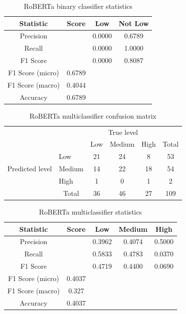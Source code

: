 \documentclass[12pt, a4paper]{article}
\begin{document}
\begin{table}[ht]
\centering
\begin{tabular}{||c c c c||} 
 \hline
 Statistic & Score & Low & Not Low  \\ [0.5ex] 
 \hline\hline
 Precision &  & 0.0000 & 0.6789 \\ 
 Recall & & 0.0000 & 1.0000 \\
 F1 Score &  & 0.0000 & 0.8087 \\
 F1 Score (micro) & 0.6789 & & \\
 F1 Score (macro)  & 0.4044 & &  \\ 
 Accuracy  & 0.6789 & & \\ [1ex] 
 \hline
\end{tabular}
\caption{RoBERTa binary classifier statistics}
\label{table:robertastat_low}
\end{table}


\begin{table}[ht]
\centering
\begin{tabular}{l|l|c|c|c|c}
\multicolumn{2}{c}{}&\multicolumn{3}{c}{True level}&\\
\cline{3-5}
\multicolumn{2}{c|}{}&Low&Medium&High&\multicolumn{1}{c}{Total}\\
\cline{2-5}
\multirow{3}{*}{Predicted level}& Low & 21 & 24 & 8 & 53\\
\cline{2-5}
& Medium & 14 & 22 & 18 & 54\\
\cline{2-5}
& High & 1 & 0 & 1 & 2\\
\cline{2-5}
\multicolumn{1}{c}{} & \multicolumn{1}{c}{Total} & \multicolumn{1}{c}{36} & \multicolumn{    1}{c}{46} & \multicolumn{    1}{c}{27} & \multicolumn{1}{c}{109}\\
\end{tabular}

\caption{RoBERTa multiclassifier confusion matrix}
\label{table:robertacm}
\end{table}

\begin{table}[ht]
\centering
\begin{tabular}{||c c c c c||} 
 \hline
 Statistic & Score & Low & Medium & High  \\ [0.5ex] 
 \hline\hline
 Precision &  & 0.3962 & 0.4074 & 0.5000 \\ 
 Recall & & 0.5833 & 0.4783  & 0.0370\\
 F1 Score &  & 0.4719 & 0.4400  & 0.0690\\
 F1 Score (micro) & 0.4037 & & & \\
 F1 Score (macro)  & 0.327 & & & \\ 
 Accuracy  & 0.4037 & & & \\ [1ex] 
 \hline
\end{tabular}
\caption{RoBERTa multiclassifier statistics}
\label{table:robertastat}
\end{table}
\end{document}
